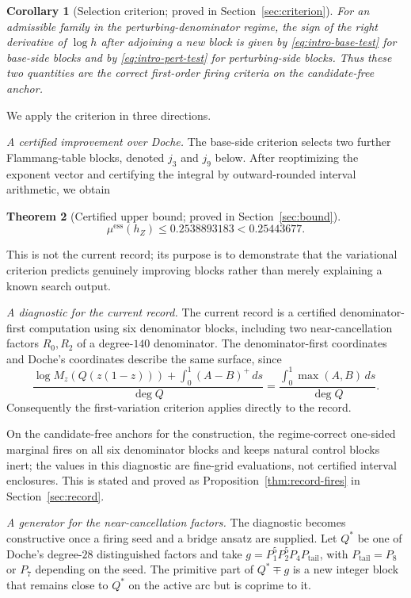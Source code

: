 \documentclass[11pt,reqno]{amsart}
\theoremstyle{plain}
\newtheorem{theorem}{Theorem}
\newtheorem{corollary}[theorem]{Corollary}
\theoremstyle{definition}
\theoremstyle{remark}
\newcommand{\hZ}{h_Z}
\newcommand{\essmin}{\mu^{\mathrm{ess}}(\hZ)}
\begin{document}
\begin{corollary}[Selection criterion; proved in Section~\ref{sec:criterion}]
\label{cor:criterion}
For an admissible family in the perturbing-denominator regime, the sign of the
right derivative of $\log h$ after adjoining a new block is given by
\eqref{eq:intro-base-test} for base-side blocks and by \eqref{eq:intro-pert-test} for
perturbing-side blocks.  Thus these two quantities are the correct first-order firing
criteria on the candidate-free anchor.
\end{corollary}

We apply the criterion in three directions.

\emph{A certified improvement over Doche.}  The base-side criterion selects two further
Flammang-table blocks, denoted $j_3$ and $j_9$ below.  After reoptimizing the exponent
vector and certifying the integral by outward-rounded interval arithmetic, we obtain
\begin{theorem}[Certified upper bound; proved in Section~\ref{sec:bound}]
\label{thm:upper}
\[
  \essmin\le 0.2538893183 <0.25443677.
\]
\end{theorem}
This is not the current record; its purpose is to demonstrate that the variational
criterion predicts genuinely improving blocks rather than merely explaining a known
search output.

\emph{A diagnostic for the current record.}  The current record \citep{Gri26} is a
certified denominator-first computation using six denominator blocks, including two
near-cancellation factors $R_0,R_2$ of a degree-$140$ denominator.  The denominator-first
coordinates and Doche's coordinates describe the same surface, since
\[
  \frac{\log M_z(Q(z(1-z)))+\int_0^1(A-B)^+\,ds}{\deg Q}
  =\frac{\int_0^1\max(A,B)\,ds}{\deg Q}.
\]
Consequently the first-variation criterion applies directly to the record.

On the candidate-free anchors for the \citet{Gri26} construction, the regime-correct
one-sided marginal fires on all six denominator blocks and keeps natural control blocks
inert; the values in this diagnostic are fine-grid evaluations, not certified interval
enclosures.  This is stated and proved as Proposition~\ref{thm:record-fires} in
Section~\ref{sec:record}.

\emph{A generator for the near-cancellation factors.}  The diagnostic becomes
constructive once a firing seed and a bridge ansatz are supplied.  Let $Q^*$ be one of
Doche's degree-$28$ distinguished factors and take
$g=P_1^5P_2^5P_4P_{\mathrm{tail}}$, with $P_{\mathrm{tail}}=P_8$ or $P_7$ depending on
the seed.  The primitive part of $Q^*\mp g$ is a new integer block that remains close
to $Q^*$ on the active arc but is coprime to it.
\end{document}
